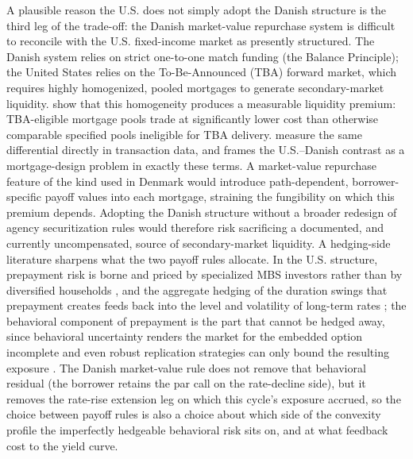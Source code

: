 \documentclass[12pt]{article}
\begin{document}
A plausible reason the U.S. does not simply adopt the Danish structure is the third leg of the trade-off: the Danish market-value repurchase system is difficult to reconcile with the U.S. fixed-income market as presently structured. The Danish system relies on strict one-to-one match funding (the Balance Principle); the United States relies on the To-Be-Announced (TBA) forward market, which requires highly homogenized, pooled mortgages to generate secondary-market liquidity. \citet{vickery2013} show that this homogeneity produces a measurable liquidity premium: TBA-eligible mortgage pools trade at significantly lower cost than otherwise comparable specified pools ineligible for TBA delivery. \citet{gao2017} measure the same differential directly in transaction data, and \citet{campbell2013} frames the U.S.--Danish contrast as a mortgage-design problem in exactly these terms. A market-value repurchase feature of the kind used in Denmark would introduce path-dependent, borrower-specific payoff values into each mortgage, straining the fungibility on which this premium depends. Adopting the Danish structure without a broader redesign of agency securitization rules would therefore risk sacrificing a documented, and currently uncompensated, source of secondary-market liquidity. A hedging-side literature sharpens what the two payoff rules allocate. In the U.S. structure, prepayment risk is borne and priced by specialized MBS investors rather than by diversified households \citep{gabaix2007}, and the aggregate hedging of the duration swings that prepayment creates feeds back into the level and volatility of long-term rates \citep{malkhozov2016}; the behavioral component of prepayment is the part that cannot be hedged away, since behavioral uncertainty renders the market for the embedded option incomplete and even robust replication strategies can only bound the resulting exposure \citep{perotti2024}. The Danish market-value rule does not remove that behavioral residual (the borrower retains the par call on the rate-decline side), but it removes the rate-rise extension leg on which this cycle's exposure accrued, so the choice between payoff rules is also a choice about which side of the convexity profile the imperfectly hedgeable behavioral risk sits on, and at what feedback cost to the yield curve.
\end{document}
